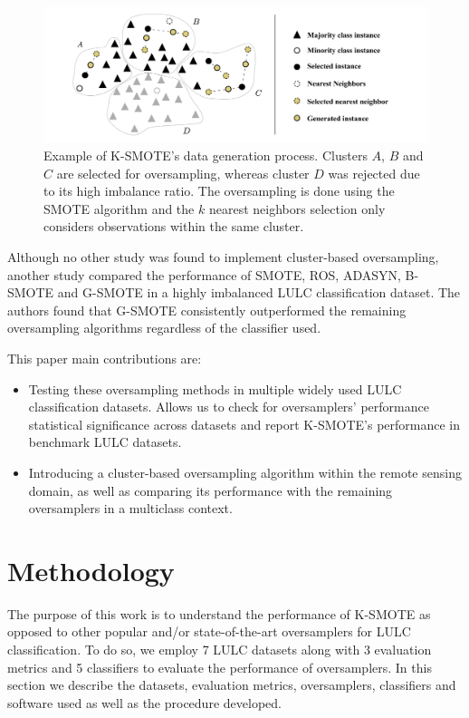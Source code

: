\documentclass[parskip=full]{scrartcl}
\begin{document}
\begin{figure}[H]
	\centering
	\includegraphics[width=1\linewidth]{../analysis/kmeans_smote_example}
	\caption{Example of K-SMOTE's data generation process. Clusters $A$,
		$B$ and $C$ are selected for
		oversampling, whereas cluster $D$ was rejected due to its
		high imbalance ratio. The oversampling is done using the SMOTE algorithm and
		the $k$ nearest neighbors selection only considers
		observations within the same cluster.}
	\label{fig:kmeans_smote_example}
\end{figure}

Although no other study was found to implement cluster-based oversampling,
another study \cite{Douzas2019rs} compared the performance of SMOTE, ROS,
ADASYN, B-SMOTE and G-SMOTE in a highly imbalanced LULC classification dataset.
The authors found that G-SMOTE consistently outperformed the remaining
oversampling algorithms regardless of the classifier used.

This paper main contributions are:
\begin{itemize}
	\item Testing these oversampling methods in multiple widely used LULC classification
	      datasets. Allows us to check for oversamplers' performance statistical
	      significance across datasets and report K-SMOTE's performance in benchmark LULC
	      datasets.
	\item Introducing a cluster-based oversampling algorithm within the remote sensing
	      domain, as well as comparing its performance with the remaining oversamplers in
	      a multiclass context.

\end{itemize}

\section{Methodology}\label{sec:methodology}

The purpose of this work is to understand the performance of K-SMOTE as opposed
to other popular and/or state-of-the-art oversamplers for LULC classification.
To do so, we employ 7 LULC datasets along with 3 evaluation metrics and 5
classifiers to evaluate the performance of oversamplers. In this section we
describe the datasets, evaluation metrics, oversamplers, classifiers and
software used as well as the procedure developed.
\end{document}
